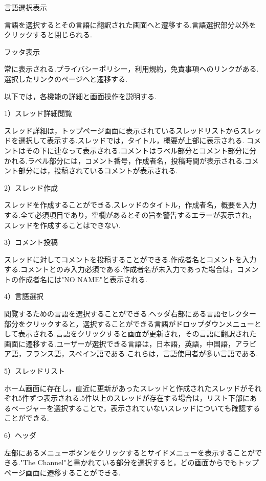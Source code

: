 \documentclass[b5paper,12pt,dvipdfmx]{jsreport}
\begin{document}
言語選択表示

言語を選択するとその言語に翻訳された画面へと遷移する.言語選択部分以外をクリックすると閉じられる.

フッタ表示

常に表示される.プライバシーポリシー，利用規約，免責事項へのリンクがある.選択したリンクのページへと遷移する.

以下では，各機能の詳細と画面操作を説明する.

1）スレッド詳細閲覧

スレッド詳細は，トップページ画面に表示されているスレッドリストからスレッドを選択して表示する.スレッドでは，タイトル，概要が上部に表示される.
コメントはその下に連なって表示される.コメントはラベル部分とコメント部分に分かれる.ラベル部分には，コメント番号，作成者名，投稿時間が表示される.コメント部分には，投稿されているコメントが表示される.

2）スレッド作成

スレッドを作成することができる.スレッドのタイトル，作成者名，概要を入力する.全て必須項目であり，空欄があるとその旨を警告するエラーが表示され，スレッドを作成することはできない.

3）コメント投稿

スレッドに対してコメントを投稿することができる.作成者名とコメントを入力する.コメントとのみ入力必須である.作成者名が未入力であった場合は，コメントの作成者名には"NO NAME"と表示される.

4）言語選択

閲覧するための言語を選択することができる.ヘッダ右部にある言語セレクター部分をクリックすると，選択することができる言語がドロップダウンメニューとして表示される.言語をクリックすると画面が更新され，その言語に翻訳された画面に遷移する.ユーザーが選択できる言語は，日本語，英語，中国語，アラビア語，フランス語，スペイン語である.これらは，言語使用者が多い言語である.

5）スレッドリスト

ホーム画面に存在し，直近に更新があったスレッドと作成されたスレッドがそれぞれ5件ずつ表示される.5件以上のスレッドが存在する場合は，リスト下部にあるページャーを選択することで，表示されていないスレッドについても確認することができる.

6）ヘッダ

左部にあるメニューボタンをクリックするとサイドメニューを表示することができる."The Channel"と書かれている部分を選択すると，どの画面からでもトップページ画面に遷移することができる.


\end{document}
